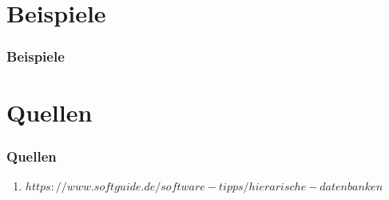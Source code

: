 \documentclass[hyperref={pdfpagelabels=false}]{beamer}
\begin{document}
\section{Beispiele} 
\begin{frame}
\frametitle{Beispiele}
\end{frame}

\section{Quellen}
\begin{frame}
\frametitle{Quellen}
\begin{enumerate} 
\item $https://www.softguide.de/software-tipps/hierarische-datenbanken$
\end{enumerate}
\end{frame}
\end{document}
